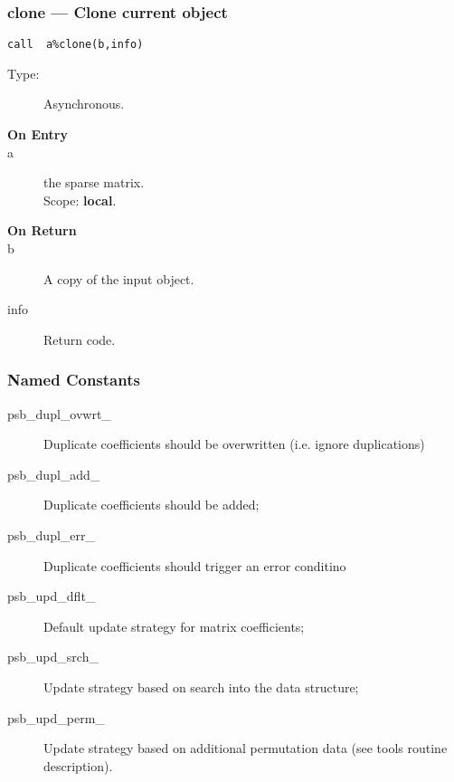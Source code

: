 \subsubsection*{clone --- Clone current object}

\begin{verbatim}
call  a%clone(b,info)
\end{verbatim}

\begin{description}
\item[Type:] Asynchronous.
\item[\bf On Entry]
\item[a] the sparse matrix.\\
Scope: {\bf local}.\\
\end{description}

\begin{description}
\item[\bf On Return]
\item[b] A copy of the input object.
\item[info] Return code. 
\end{description}


\subsubsection{Named Constants}
\label{sec:sp_constants}
\begin{description}
\item[psb\_dupl\_ovwrt\_] Duplicate coefficients should be overwritten
  (i.e. ignore duplications)
\item[psb\_dupl\_add\_] Duplicate coefficients should be added;	         
\item[psb\_dupl\_err\_] Duplicate coefficients should trigger an error conditino
\item[psb\_upd\_dflt\_] Default update strategy for matrix coefficients;
\item[psb\_upd\_srch\_] Update strategy based on search into the data structure;
\item[psb\_upd\_perm\_] Update strategy based on additional
  permutation data (see tools routine description).
\end{description}


